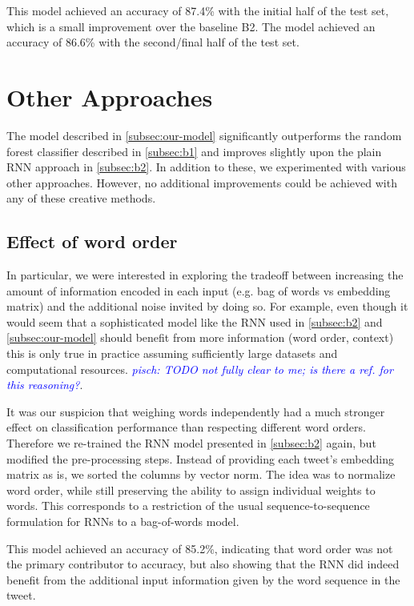 \documentclass[10pt,conference,compsocconf]{IEEEtran}
\newcommand{\pisch}[1]{\textit{\textcolor{blue}{pisch: #1}}}
\begin{document}
This model achieved an accuracy of 87.4\% with the initial half of the test set,
which is a small improvement over the baseline B2.
The model achieved an accuracy of 86.6\% with the second/final half of the test set.

\section{Other Approaches} \label{sec:other}

The model described in \autoref{subsec:our-model} significantly outperforms
the random forest classifier described in \autoref{subsec:b1} and improves
slightly upon the plain RNN approach in \autoref{subsec:b2}. In addition to
these, we experimented with various other approaches.
However, no additional improvements could be achieved with
any of these creative methods.

\subsection*{Effect of word order}

In particular, we were interested in exploring the tradeoff between
increasing the amount of information encoded in each input (e.g. bag
of words vs embedding matrix) and the additional noise invited by
doing so. For example, even though it would seem that a sophisticated
model like the RNN used in \autoref{subsec:b2} and \autoref{subsec:our-model}
should benefit from more information (word order, context) this is only true
in practice assuming sufficiently large datasets and computational
resources. \pisch{TODO not fully clear to me; is there a ref. for this reasoning?}.

It was our suspicion that weighing words independently had a much
stronger effect on classification performance than respecting
different word orders. Therefore we re-trained the RNN model presented
in \autoref{subsec:b2} again, but modified the pre-processing
steps. Instead of providing each tweet's embedding matrix as is, we
sorted the columns by vector norm. The idea was to normalize word
order, while still preserving the ability to assign individual weights
to words. This corresponds to a restriction of the usual
sequence-to-sequence formulation for RNNs to a bag-of-words model.

This model achieved an accuracy of 85.2\%, indicating that word order
was not the primary contributor to accuracy, but also showing that the
RNN did indeed benefit from the additional input information given by
the word sequence in the tweet.
\end{document}
